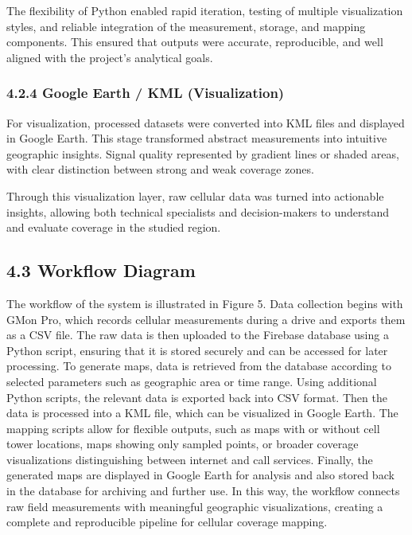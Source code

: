 \documentclass[11pt]{article}
\begin{document}
The flexibility of Python enabled rapid iteration, testing of multiple
visualization styles, and reliable integration of the measurement,
storage, and mapping components. This ensured that outputs were
accurate, reproducible, and well aligned with the project's analytical
goals.

\hypertarget{google-earth-kml-visualization}{%
\subsubsection{4.2.4 Google Earth / KML
(Visualization)}\label{google-earth-kml-visualization}}

For visualization, processed datasets were converted into KML files and
displayed in Google Earth\cite{googleearth2025}. This stage transformed abstract measurements
into intuitive geographic insights. Signal quality represented by
gradient lines or shaded areas, with clear distinction between strong
and weak coverage zones.

Through this visualization layer, raw cellular data was turned into
actionable insights, allowing both technical specialists and
decision-makers to understand and evaluate coverage in the studied
region.

\hypertarget{workflow-diagram}{%
\subsection{4.3 Workflow Diagram}\label{workflow-diagram}}

The workflow of the system is illustrated in Figure 5. Data collection
begins with GMon Pro, which records cellular measurements during a drive
and exports them as a CSV file. The raw data is then uploaded to the
Firebase database using a Python script, ensuring that it is stored
securely and can be accessed for later processing. To generate maps,
data is retrieved from the database according to selected parameters
such as geographic area or time range. Using additional Python scripts,
the relevant data is exported back into CSV format. Then the data is
processed into a KML file, which can be visualized in Google Earth. The
mapping scripts allow for flexible outputs, such as maps with or without
cell tower locations, maps showing only sampled points, or broader
coverage visualizations distinguishing between internet and call
services. Finally, the generated maps are displayed in Google Earth for
analysis and also stored back in the database for archiving and further
use. In this way, the workflow connects raw field measurements with
meaningful geographic visualizations, creating a complete and
reproducible pipeline for cellular coverage mapping.
\end{document}
